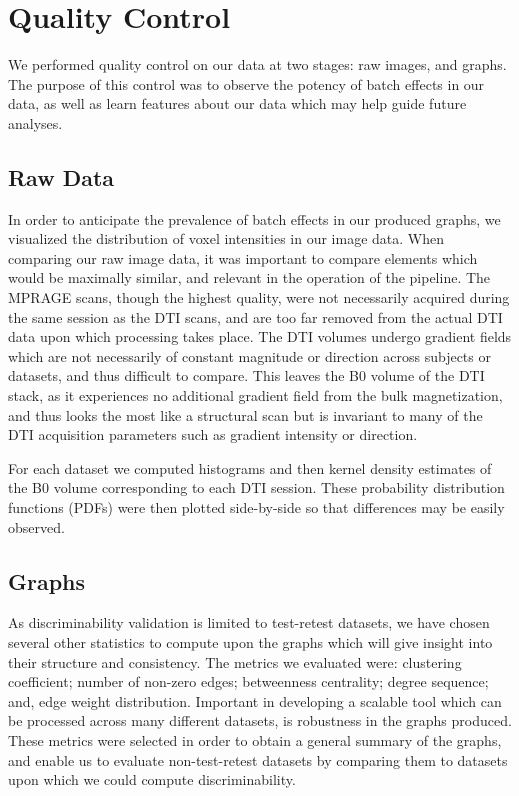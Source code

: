 \section{Quality Control}
We performed quality control on our data at two stages: raw images, and graphs. The purpose of this control was to observe the potency of batch effects in our data, as well as learn features about our data which may help guide future analyses.

\subsection{Raw Data}
In order to anticipate the prevalence of batch effects in our produced graphs, we visualized the distribution of voxel intensities in our image data. When comparing our raw image data, it was important to compare elements which would be maximally similar, and relevant in the operation of the pipeline. The MPRAGE scans, though the highest quality, were not necessarily acquired during the same session as the DTI scans, and are too far removed from the actual DTI data upon which processing takes place. The DTI volumes undergo gradient fields which are not necessarily of constant magnitude or direction across subjects or datasets, and thus difficult to compare. This leaves the B0 volume of the DTI stack, as it experiences no additional gradient field from the bulk magnetization, and thus looks the most like a structural scan but is invariant to many of the DTI acquisition parameters such as gradient intensity or direction.

For each dataset we computed histograms and then kernel density estimates of the B0 volume corresponding to each DTI session. These probability distribution functions (PDFs) were then plotted side-by-side so that differences may be easily observed.

\subsection{Graphs}
As discriminability validation is limited to test-retest datasets, we have chosen several other statistics to compute upon the graphs which will give insight into their structure and consistency. The metrics we evaluated were: clustering coefficient; number of non-zero edges; betweenness centrality; degree sequence; and, edge weight distribution. Important in developing a scalable tool which can be processed across many different datasets, is robustness in the graphs produced. These metrics were selected in order to obtain a general summary of the graphs, and enable us to evaluate non-test-retest datasets by comparing them to datasets upon which we could compute discriminability.

